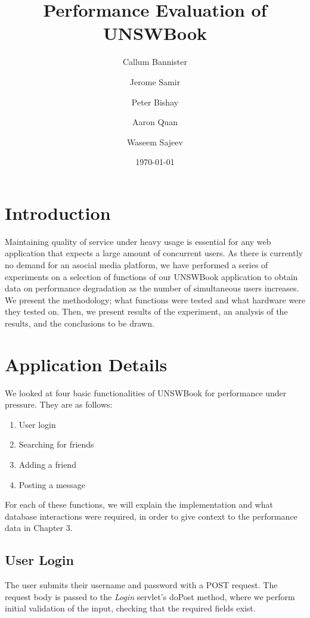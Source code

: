 \documentclass[11pt]{report}
\begin{document}
\title{Performance Evaluation of UNSWBook}
\author{Callum Bannister \and Jerome Samir \and Peter Bishay \and 
Aaron Quan \and Waseem Sajeev}
\date{\today}
\maketitle

\tableofcontents

\chapter{Introduction}
Maintaining quality of service under heavy usage is essential for any web application that expects
a large amount of concurrent users. As there is currently no demand for an asocial media platform,
we have performed a series of experiments on a selection of functions of our UNSWBook application to obtain data on performance degradation as the number of simultaneous users increases. We present the methodology; what functions were tested and what hardware were they tested on. Then, we present results of the experiment, an analysis of the results, and the conclusions to be drawn.  

\chapter{Application Details}

We looked at four basic functionalities of UNSWBook for performance under pressure. They are as follows:

\begin{enumerate}
\item{User login}
\item{Searching for friends}
\item{Adding a friend}
\item{Posting a message}
\end{enumerate}

For each of these functions, we will explain the implementation and what database interactions were required, in order to give context to the performance data in Chapter 3.

\section{User Login}

The user submits their username and password with a POST request. The request body is passed to
the \emph{Login} servlet's doPost method, where we perform initial validation of the input, checking that the required fields exist. \\
\end{document}
